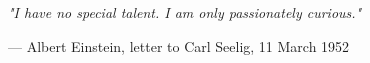 \thispagestyle{empty}


\begin{center}
\vspace{4cm}

\emph{"I have no special talent. I am only passionately curious."}
\vspace{1cm}

— Albert Einstein, letter to Carl Seelig, 11 March 1952

\end{center}

